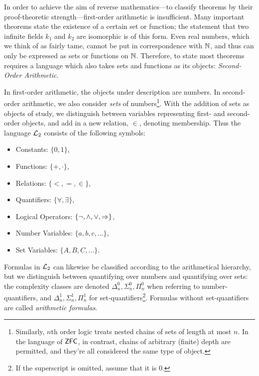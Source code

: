 \documentclass{amsart}
\begin{document}
	In order to achieve the aim of reverse mathematics---to classify theorems by their proof-theoretic strength---first-order arithmetic is insufficient. Many important theorems state the existence of a certain set or function; the statement that two infinite fields $k_1$ and $k_2$ are isomorphic is of this form. Even real numbers, which we think of as fairly tame, cannot be put in correspondence with $\mathbb{N}$, and thus can only be expressed as sets or functions on $\mathbb{N}$. Therefore, to state most theorems requires a language which also takes sets and functions as its objects: \textit{Second-Order Arithmetic}.
	
	In first-order arithmetic, the objects under description are numbers. In second-order arithmetic, we also consider \textit{sets} of numbers\footnote{Similarly, $n$th order logic treats nested chains of sets of length at most $n$. In the language of $\sf{ZFC}$, in contrast, chains of arbitrary (finite) depth are permitted, and they're all considered the same type of object.}. With the addition of sets as objects of study, we distinguish between variables representing first- and second-order objects, and add in a new relation, $\in$, denoting membership. Thus the language $\mathcal{L}_2$ consists of the following symbols:
	\begin{itemize}
		\item Constants: $\{0,1\}$, 
		\item Functions: $\{+,\cdot\}$,
		\item Relations: $\{<,=,\in\}$,
		\item Quantifiers: $\{\forall,\exists\}$,
		\item Logical Operators: $\{\neg,\wedge,\vee,\Rightarrow\}$,
		\item Number Variables: $\{a,b,c,\dots\}$, 
		\item Set Variables: $\{A,B,C,\dots\}$.
	\end{itemize}
	Formulas in $\mathcal{L}_2$ can likewise be classified according to the arithmetical hierarchy, but we distinguish between quantifying over numbers and quantifying over sets: the complexity classes are denoted $\Delta_n^0,\Sigma_n^0,\Pi_n^0$ when referring to number-quantifiers, and $\Delta_n^1,\Sigma_n^1,\Pi_n^1$ for set-quantifiers\footnote{If the superscript is omitted, assume that it is 0.}. Formulas without set-quantifiers are called \textit{arithmetic formulas}.\\
	
	
\end{document}
